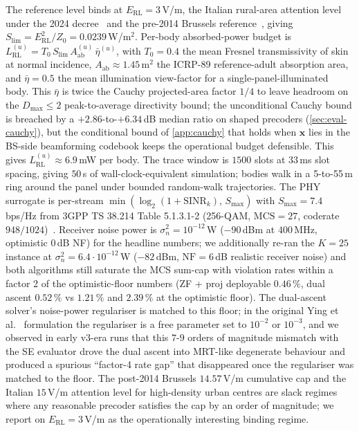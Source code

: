 \documentclass[journal,twocolumn,10pt]{IEEEtran}
\theoremstyle{plain}
\theoremstyle{remark}
\newcommand{\xx}{\mathbf{x}}
\newcommand{\Aab}{A_{\mathrm{ab}}}
\begin{document}
The reference level binds at $E_{\mathrm{RL}} = 3\,$V/m, the Italian
rural-area attention level under the 2024 decree~\cite{ItalyDL} and
the pre-2014 Brussels reference~\cite{BrusselsArrete2007}, giving
$S_{\mathrm{lim}} = E_{\mathrm{RL}}^2 / Z_0 = 0.0239\,$W/m$^2$.
Per-body absorbed-power budget is
$L^{(u)}_{\mathrm{RL}} = T_0\,S_{\mathrm{lim}}\,\Aab^{(u)}\,
\bar\eta^{(u)}$, with $T_0 = 0.4$ the mean Fresnel transmissivity
of skin at normal incidence, $\Aab \approx 1.45\,$m$^2$ the
ICRP-89 reference-adult absorption area, and $\bar\eta = 0.5$
the mean illumination view-factor for a single-panel-illuminated
body. This $\bar\eta$ is twice the Cauchy projected-area
factor $1/4$ to leave headroom on the $D_{\max} \leq 2$
peak-to-average directivity bound; the unconditional Cauchy bound
is breached by a $+2.86$-to-$+6.34\,$dB median ratio on shaped
precoders (\cref{sec:eval-cauchy}), but the conditional bound of
\cref{app:cauchy} that holds when $\xx$ lies in the BS-side
beamforming codebook keeps the operational budget defensible.
This gives $L^{(u)}_{\mathrm{RL}} \approx 6.9\,$mW per body. The trace window is
$1500$ slots at $33\,$ms slot spacing, giving $50\,$s of
wall-clock-equivalent simulation; bodies walk in a 5-to-55$\,$m ring
around the panel under bounded random-walk trajectories. The PHY
surrogate is per-stream $\min(\log_2(1+\mathrm{SINR}_k),\,
S_{\max})$ with $S_{\max} = 7.4\,$bps/Hz from 3GPP TS 38.214
Table 5.1.3.1-2 (256-QAM, $\mathrm{MCS}=27$, coderate
$948/1024$)~\cite{TS38214MCS}. Receiver noise power is
$\sigma_n^2 = 10^{-12}\,$W ($-90\,$dBm at $400\,$MHz, optimistic
$0\,$dB NF) for the headline numbers; we additionally re-ran the
$K = 25$ instance at $\sigma_n^2 = 6.4 \cdot 10^{-12}\,$W
($-82\,$dBm, $\mathrm{NF} = 6\,$dB realistic receiver noise) and
both algorithms still saturate the MCS sum-cap with violation
rates within a factor 2 of the optimistic-floor numbers (ZF + proj
deployable $0.46\,\%$, dual ascent $0.52\,\%$ vs $1.21\,\%$ and
$2.39\,\%$ at the optimistic floor). The dual-ascent solver's
noise-power regulariser is matched to this floor; in the original
Ying et al.~\cite{Ying2017} formulation the regulariser is a free
parameter set to $10^{-2}$ or $10^{-3}$, and we observed
in early v3-era runs that this $7$-$9$ orders of magnitude
mismatch with the SE evaluator drove the dual ascent into
MRT-like degenerate behaviour and produced a spurious
``factor-4 rate gap'' that disappeared once the regulariser was
matched to the floor.
The post-2014 Brussels $14.57\,$V/m cumulative cap and the Italian
$15\,$V/m attention level for high-density urban centres are slack
regimes where any reasonable precoder satisfies the cap by an order
of magnitude; we report on $E_{\mathrm{RL}} = 3\,$V/m as the
operationally interesting binding regime.
\end{document}
